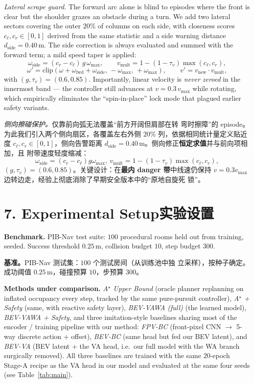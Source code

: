 \documentclass[11pt,a4paper]{article}
\newcommand{\en}[1]{\par\noindent #1\par\vspace{0.15em}}
\newcommand{\zh}[1]{\par\noindent\color{zhcol}\hspace{0.5em}#1\par\color{black}\vspace{0.6em}}
\newcommand{\bisec}[2]{\section[#1]{#1\quad\normalfont\small\color{zhcol}\textsf{#2}}}
\begin{document}
\en{\emph{Lateral scrape guard.} The forward arc alone is blind to
episodes where the front is clear but the shoulder grazes an obstacle
during a turn. We add two lateral sectors covering the outer $20\%$ of
columns on each side, with closeness scores
$c_\ell, c_r \in [0,1]$ derived from the same statistic and a side warning
distance $d_{\mathrm{side}}=0.40\,$m. The side correction is always
evaluated and summed with the forward term; a mild speed taper is applied:
\begin{equation}
  \omega_{\mathrm{side}} = (c_r - c_\ell)\,g\,\omega_{\max},\qquad
  v_{\mathrm{mult}} = 1 - (1-\tau_v)\max(c_\ell, c_r),
\end{equation}
\begin{equation}
  \omega' = \mathrm{clip}(\omega + \omega_{\mathrm{fwd}} + \omega_{\mathrm{side}},\,
                          -\omega_{\max},\,+\omega_{\max}),
  \qquad
  v' = v_{\mathrm{new}}\cdot v_{\mathrm{mult}},
\end{equation}
with $(g, \tau_v) = (0.6, 0.85)$. Importantly, linear velocity is
\emph{never zeroed} in the innermost band — the controller still advances
at $v = 0.3\,v_{\max}$ while rotating, which empirically eliminates the
``spin-in-place'' lock mode that plagued earlier safety variants.}

\zh{\textsf{\emph{侧向擦碰保护。}仅靠前向弧无法覆盖“前方开阔但肩部在转
弯时擦障”的 episode。为此我们引入两个侧向扇区，各覆盖左右外侧 $20\%$
列，依据相同统计量定义贴近度 $c_\ell, c_r \in [0,1]$，侧向告警距离
$d_{\mathrm{side}}=0.40\,$m。侧向修正\textbf{恒定求值}并与前向项相加，且
附带速度轻度缩减：
\[
 \omega_{\mathrm{side}} = (c_r - c_\ell)g\omega_{\max},\
 v_{\mathrm{mult}} = 1 - (1-\tau_v)\max(c_\ell, c_r),
\]
$(g,\tau_v)=(0.6,0.85)$。关键设计：在\textbf{最内 danger 带}中线速仍保持
$v = 0.3 v_{\max}$ 边转边走，经验上彻底消除了早期安全版本中的“原地自旋死
锁”。}}

\bisec{7. Experimental Setup}{实验设置}

\en{\textbf{Benchmark.} PIB-Nav test suite: $100$ procedural rooms held
out from training, seeded. Success threshold $0.25\,$m, collision budget
$10$, step budget $300$.}

\zh{\textsf{\textbf{基准。}PIB-Nav 测试集：$100$ 个测试房间（从训练池中独
立采样），按种子确定。成功阈值 $0.25\,$m，碰撞预算 $10$，步预算 $300$。}}

\en{\textbf{Methods under comparison.}
\emph{A$^\star$ Upper Bound} (oracle planner replanning on inflated
occupancy every step, tracked by the same pure-pursuit controller),
\emph{A$^\star$ + Safety} (same, with reactive safety layer),
\emph{BEV-VAWA (full)} (the learned model),
\emph{BEV-VAWA + Safety}, and three imitation-style baselines sharing
most of the encoder / training pipeline with our method:
\emph{FPV-BC} (front-pixel CNN $\to$ 5-way discrete action + offset),
\emph{BEV-BC} (same head but fed our BEV latent), and
\emph{BEV-VA} (BEV latent + the VA head, i.e.\ our full model with the
WA branch surgically removed). All three baselines are trained with
the same $20$-epoch Stage-A recipe as the VA head in our model and
evaluated at the same four seeds (see Table~\ref{tab:main}).}
\end{document}

